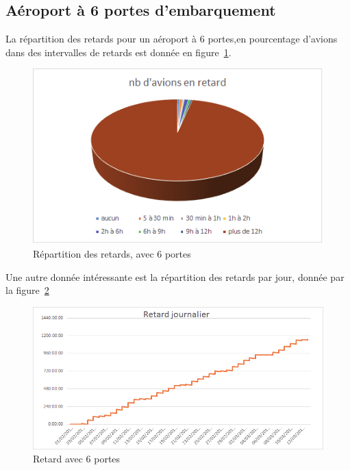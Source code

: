  \subsection{Aéroport à 6 portes d'embarquement}
La répartition des retards pour un aéroport à 6 portes,en pourcentage d'avions dans des intervalles de retards est donnée en figure~\ref{retard_camenbert_6}.
  \graphicspath{{donnees/graph_90jours/6portes/}}
\begin{figure}[H]
\centering \includegraphics[scale=0.6]{retard_avions.png}
 \caption{\label{retard_camenbert_6} Répartition des retards, avec 6 portes} 
\end{figure}
 
 Une autre donnée intéressante est la répartition des retards par jour, donnée par la figure~\ref{retard_jour_6}
\begin{figure}[H]
\centering \includegraphics[scale=0.6]{retard_jour.png}
 \caption{\label{retard_jour_6} Retard avec 6 portes} 
\end{figure}
 
